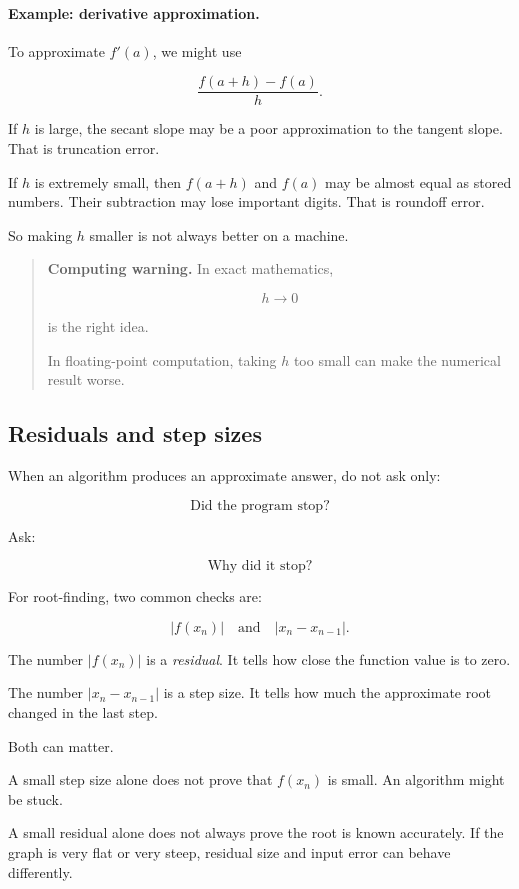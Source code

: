 \paragraph{Example: derivative approximation.}
To approximate \(f'(a)\), we might use

\[
\frac{f(a+h)-f(a)}{h}.
\]

If \(h\) is large, the secant slope may be a poor approximation to the tangent slope.
That is truncation error.

If \(h\) is extremely small, then \(f(a+h)\) and \(f(a)\) may be almost equal as stored
numbers.  Their subtraction may lose important digits.  That is roundoff error.

So making \(h\) smaller is not always better on a machine.

\begin{quote}
\textbf{Computing warning.}
In exact mathematics,

\[
h\to0
\]

is the right idea.

In floating-point computation, taking \(h\) too small can make the numerical result
worse.
\end{quote}

\subsection{Residuals and step sizes}
\label{appsubsec:residuals-step-sizes}

When an algorithm produces an approximate answer, do not ask only:

\[
\text{Did the program stop?}
\]

Ask:

\[
\text{Why did it stop?}
\]

For root-finding, two common checks are:

\[
|f(x_n)| \quad \text{and} \quad |x_n-x_{n-1}|.
\]

The number \(|f(x_n)|\) is a \emph{residual}.  It tells how close the function value is to
zero.

The number \(|x_n-x_{n-1}|\) is a step size.  It tells how much the approximate root
changed in the last step.

Both can matter.

A small step size alone does not prove that \(f(x_n)\) is small.  An algorithm might be
stuck.

A small residual alone does not always prove the root is known accurately.  If the graph
is very flat or very steep, residual size and input error can behave differently.


